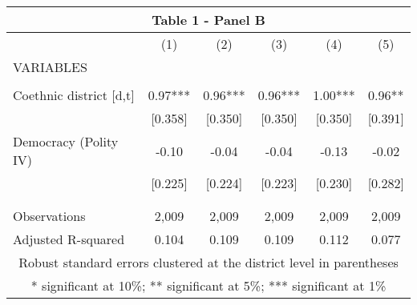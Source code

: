 \begin{tabular}{lccccc}
\multicolumn{6}{c}{Table 1 - Panel B} \\ \hline
 & (1) & (2) & (3) & (4) & (5) \\
VARIABLES &  &  &  &  &  \\ \hline
 &  &  &  &  &  \\
Coethnic district [d,t] & 0.97*** & 0.96*** & 0.96*** & 1.00*** & 0.96** \\
 & [0.358] & [0.350] & [0.350] & [0.350] & [0.391] \\
Democracy (Polity IV) & -0.10 & -0.04 & -0.04 & -0.13 & -0.02 \\
 & [0.225] & [0.224] & [0.223] & [0.230] & [0.282] \\
 &  &  &  &  &  \\
 &  &  &  &  &  \\
Observations & 2,009 & 2,009 & 2,009 & 2,009 & 2,009 \\
 Adjusted R-squared & 0.104 & 0.109 & 0.109 & 0.112 & 0.077 \\ \hline
\multicolumn{6}{c}{ Robust standard errors clustered at the district level in parentheses} \\
\multicolumn{6}{c}{ * significant at 10\%; ** significant at 5\%; *** significant at 1\%} \\
\end{tabular}
